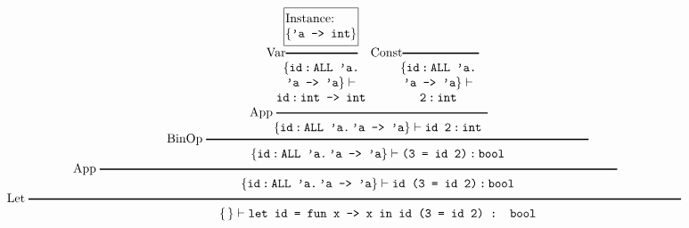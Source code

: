 \documentclass{article}
\begin{document}
$$\begin{array}{c}
\begin{array}[b]{c}
\begin{array}[b]{c}
\begin{array}[b]{c}
               \begin{array}[b]{c}
                 \fbox{\hspace*{-.8em}\begin{tabular}{l}Instance:\\
                     $\{\texttt{'a -> int}\}$\end{tabular}\hspace*{-.8em}}\\
                 \hspace*{-.2in}\mbox{Var}\rule[2pt]{.8in}{1pt}\\
                  \{\texttt{id\,:\,ALL 'a.}\\\texttt{'a -> 'a}\}\vdash\\
                  \texttt{id\,:\,int -> int}
               \end{array}\quad\;\;
               \begin{array}[b]{c}
                 \hspace*{-.3in}\mbox{Const}\rule[2pt]{.85in}{1pt}\\
                 \{\texttt{id\,:\,ALL 'a.}\\
                 \texttt{'a -> 'a}\}\vdash\\
                  \texttt{2\,:\,int}
               \end{array}\\
               \hspace*{-.2in}\mbox{App}\;\rule[2pt]{2.35in}{1pt}\\
               \{\texttt{id\,:\,ALL 'a.\,'a -> 'a}\}\vdash
               \texttt{id 2\,:\,int}\\[-1.5ex]
           \end{array}
    \\
    \mbox{BinOp}\;\rule[2pt]{4.25in}{1pt}\\
    \{\texttt{id\,:\,ALL 'a.\,'a -> 'a}\}\vdash
    \texttt{(3 = id 2)\,:\,bool}\\
  \end{array}
  \\
\qquad \mbox{App}\;\rule[2pt]{5.75in}{1pt}\rule[2pt]{1in}{0pt}\\
  \{\texttt{id\,:\,ALL 'a.\,'a -> 'a}\}\vdash
  \texttt{id (3 = id 2)\,:\,bool}\\
  \end{array}\\
    \hspace*{-.75in}\mbox{Let}\;\rule[2pt]{7.25in}{1pt}\\
\{\,\}\vdash\texttt{let id = fun x -> x in id (3 = id 2) : bool}
\end{array}
$$
\end{document}
